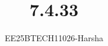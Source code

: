 \documentclass[journal]{IEEEtran}
\begin{document}

\vspace{3cm}

\title{7.4.33}
\author{EE25BTECH11026-Harsha}
 \maketitle
{\let\newpage\relax\maketitle}

\renewcommand{\thefigure}{\theenumi}
\renewcommand{\thetable}{\theenumi}
\setlength{\intextsep}{10pt} %


\renewcommand{\thetable}{\theenumi}
\end{document}
